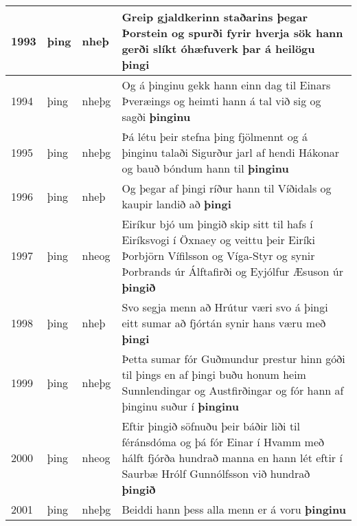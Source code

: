 \documentclass{article}
\begin{document}
\begin{longtable}{p{1cm}|p{1cm}|p{1cm}|p{13cm}}
\hline
1993&þing&nheþ&Greip gjaldkerinn staðarins þegar Þorstein og spurði fyrir hverja sök hann gerði slíkt óhæfuverk þar á heilögu \textbf{þingi} \\
\hline
1994&þing&nheþg&Og á þinginu gekk hann einn dag til Einars Þveræings og heimti hann á tal við sig og sagði \textbf{þinginu} \\
\hline
1995&þing&nheþg&Þá létu þeir stefna þing fjölmennt og á þinginu talaði Sigurður jarl af hendi Hákonar og bauð bóndum hann til \textbf{þinginu} \\
\hline
1996&þing&nheþ&Og þegar af þingi ríður hann til Víðidals og kaupir landið að \textbf{þingi} \\
\hline
1997&þing&nheog&Eiríkur bjó um þingið skip sitt til hafs í Eiríksvogi í Öxnaey og veittu þeir Eiríki Þorbjörn Vífilsson og Víga-Styr og synir Þorbrands úr Álftafirði og Eyjólfur Æsuson úr \textbf{þingið} \\
\hline
1998&þing&nheþ&Svo segja menn að Hrútur væri svo á þingi eitt sumar að fjórtán synir hans væru með \textbf{þingi} \\
\hline
1999&þing&nheþg&Þetta sumar fór Guðmundur prestur hinn góði til þings en af þingi buðu honum heim Sunnlendingar og Austfirðingar og fór hann af þinginu suður í \textbf{þinginu} \\
\hline
2000&þing&nheog&Eftir þingið söfnuðu þeir báðir liði til féránsdóma og þá fór Einar í Hvamm með hálft fjórða hundrað manna en hann lét eftir í Saurbæ Hrólf Gunnólfsson við hundrað \textbf{þingið} \\
\hline
2001&þing&nheþg&Beiddi hann þess alla menn er á voru \textbf{þinginu} \\
\hline
\end{longtable}
\end{document}
